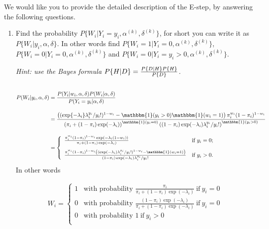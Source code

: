 \documentclass[a4paper,12pt]{article}\usepackage[]{graphicx}\usepackage[]{color}
\begin{document}
We would like you to provide the detailed description of the E-step, by 
answering the following
questions.
\begin{enumerate}
 \item[b)] Find the probability $P\{W_i|Y_i=y_i, \alpha^{(k)}, 
\delta^{(k)}\}$, for short
you can write it as $P\{W_i|y_i, \alpha, \delta\}$. In other words find
$P\{W_i=1|Y_i=0, \alpha^{(k)}, \delta^{(k)}\}$, $P\{W_i=0|Y_i=0,
\alpha^{(k)}, \delta^{(k)}\}$ and $P\{W_i=0|Y_i=y_i>0, \alpha^{(k)},
\delta^{(k)}\}$.

\noindent\textit{Hint: use the Bayes formula $P\{H|D\}={P\{D|H\} P\{H\}\over
P\{D\}}$.}\\  
 \\
\color{blue}
\begin{align*}
    P(W_i|y_i, \alpha, \delta) &= \frac{P(Y_i|w_i,\alpha, \delta)P(W_i|\alpha, \delta)}{P(Y_i=y_i|\alpha, \delta)}\\[1em]
    &= \frac{\left( (\exp\{-\lambda_i\}\lambda_i^{y_i}/y_i!)^{1-w_i}- \mathbbm{1}(y_i>0)\mathbbm{1}(w_i =1)\right) \pi_i^{w_i}(1-\pi_i)^{1-w_i}}{\left(\pi_i+(1-\pi_i)\exp(-\lambda_i)\right)^{\mathbbm{1}(y_i=0)}\left((1-\pi_i)\exp(-\lambda_i)\lambda_i^{y_i}/y_i!\right)^{\mathbbm{1}(y_i>0)}}\\[1em]
    &= \left\{
	\begin{array}{ll}
		\frac{\pi_i^{w_i}(1-\pi_i)^{1-w_i}\exp(-\lambda_i(1-w_i))}{\pi_i+(1-\pi_i)\exp(-\lambda_i)}  & \mbox{if } y_i=0; \\[1em]
		\frac{\pi_i^{w_i}(1-\pi_i)^{1-w_i}\left((\exp(-\lambda_i)\lambda_i^{y_i}/y_i!)^{1-w_i}-\mathbbm{1}(w_i=1)\right)}{(1-\pi_i)\exp(-\lambda_i)\lambda_i^{y_i}/y_i!} & \mbox{if } y_i>0.
	\end{array}
\right.
\end{align*}
In other words

\begin{align*}
    W_i =
\left\{
	\begin{array}{ll}
		1  & \mbox{with probability } \frac{\pi_i}{\pi_i+(1-\pi_i)\exp(-\lambda_i)}\ \mbox{if}\ y_i = 0 \\[1em]
		0  & \mbox{with probability } \frac{(1-\pi_i)\exp(-\lambda_i)}{\pi_i+(1-\pi_i)\exp(-\lambda_i)}\ \mbox{if}\ y_i = 0 \\[1em]
		0  & \mbox{with probability } 1\ \mbox{if}\ y_i > 0 \\
	\end{array}
\right.
\end{align*}
\color{black}


\end{enumerate}
\end{document}
